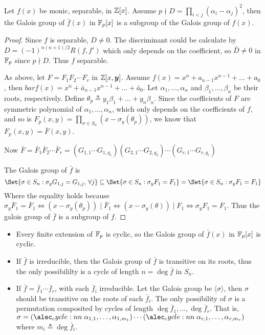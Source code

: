 \begin{theorem}
  Let $f(x)$ be monic, separable, in $\mathbb{Z}[x]$. Assume $p \nmid D = \prod_{i < j} (\alpha_i - \alpha_j)^2$,
  then the Galois group of $\bar{f}(x)$ in $\mathbb{F}_p[x]$ is a subgroup of the Galois group of $f(x)$.

  \begin{proof}
    Since $f$ is separable, $D \neq 0$. The discriminant could be calculate
    by $D = (-1)^{n(n+1)/2} R(f, f')$ which only depends on the coefficient,
    so $\bar{D} \neq 0$ in $\mathbb{F}_p$ since $p \nmid D$. Thus $f$ separable.

    As above, let $F = F_1 F_2 \dotsm F_r$ in $\mathbb{Z}[x, \bm{y}]$.
    Assume $f(x) = x^n + a_{n-1} x^{n-1} + \dots + a_0$, then $bar{f}(x) = x^n + \bar{a}_{n-1}x^{n-1} + \dots + \bar{a}_0$.
    Let $\alpha_1, \dots, \alpha_n$ and $\beta_1, \dots, \beta_n$ be their roots, respectively.
    Define $\theta_p \triangleq y_1 \beta_1 + \dots + y_n \beta_n$.
    Since the coefficients of $F$ are symmetric polynomial of $\alpha_1, \dots, \alpha_n$, which
    only depends on the coefficients of $f$, and so is $F_p(x, y) = \prod_{\sigma \in S_n}(x - \sigma_y(\theta_p))$,
    we know that $F_p(x, y) = \bar{F}(x, y)$.

    Now $\bar{F} = \bar{F}_1 \bar{F}_2 \dotsm \bar{F}_r
    = (G_{1, 1} \dotsm G_{1, q_1})(G_{2, 1} \dotsm G_{2, q_2}) \dotsm (G_{r, 1} \dotsm G_{r, q_r})$

    The Galois group of $\bar{f}$ is
    \[ \Set{ \sigma \in S_n : \sigma_y G_{1, j} = G_{1, j}, \, \forall j }
      \subseteq \Set{ \sigma \in S_n : \sigma_y F_1 = F_1 } = \Set{\sigma \in S_n : \sigma_y F_1 = F_1} \]
    Where the equality holds because $\sigma_y \bar{F}_1 = \bar{F}_1 \iff (x - \sigma_y(\theta_p)) \mid \bar{F}_1
    \iff (x - \sigma_y(\theta)) \mid F_1 \iff \sigma_y F_1 = F_1$. Thus the galois group
    of $\bar{f}$ is a subgroup of $f$.
  \end{proof}
\end{theorem}

\begin{fact} \hfill
  \begin{itemize}
    \item Every finite extension of $\mathbb{F}_p$ is cyclic, so the Galois group of $\bar{f}(x)$
      in $\mathbb{F}_p[x]$ is cyclic.
    \item If $\bar{f}$ is irreducible, then the Galois group of $\bar{f}$ is transitive on its roots,
      thus the only possibililty is a cycle of length $n = \deg \bar{f}$ in $S_n$.
    \item If $\bar{f} = \bar{f}_1 \dotsm \bar{f}_r$, with each $\bar{f}_i$ irreducible.
      Let the Galois group be $\langle \sigma \rangle$, then $\sigma$ should be
      transitive on the roots of each $\bar{f}_i$. The only possibility of $\sigma$
      is a permutation composited by cycles of length $\deg \bar{f}_1, \dots, \deg \bar{f}_r$.
      That is, $\sigma = \cycle{\alpha_{1,1}, \dots, \alpha_{1, m_1}} \dotsm
      \cycle{\alpha_{r,1}, \dots, \alpha_{r, m_r}}$ where $m_i \triangleq \deg \bar{f}_i$.
  \end{itemize}
\end{fact}
